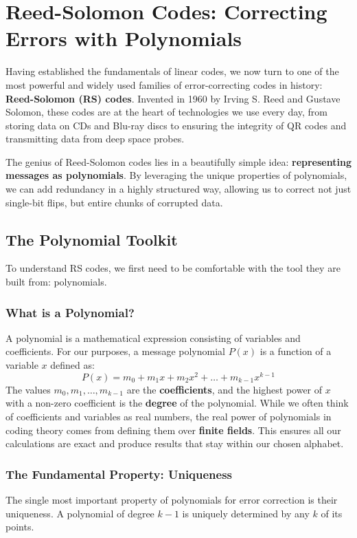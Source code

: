 \documentclass{article}
\begin{document}
\section{Reed-Solomon Codes: Correcting Errors with Polynomials}

Having established the fundamentals of linear codes, we now turn to one of the most powerful and widely used families of error-correcting codes in history: \textbf{Reed-Solomon (RS) codes}. Invented in 1960 by Irving S. Reed and Gustave Solomon, these codes are at the heart of technologies we use every day, from storing data on CDs and Blu-ray discs to ensuring the integrity of QR codes and transmitting data from deep space probes.

The genius of Reed-Solomon codes lies in a beautifully simple idea: \textbf{representing messages as polynomials}. By leveraging the unique properties of polynomials, we can add redundancy in a highly structured way, allowing us to correct not just single-bit flips, but entire chunks of corrupted data.

\subsection{The Polynomial Toolkit}
To understand RS codes, we first need to be comfortable with the tool they are built from: polynomials.

\subsubsection{What is a Polynomial?}
A polynomial is a mathematical expression consisting of variables and coefficients. For our purposes, a message polynomial $P(x)$ is a function of a variable $x$ defined as:
\[
P(x) = m_0 + m_1 x + m_2 x^2 + \dots + m_{k-1} x^{k-1}
\]
The values $m_0, m_1, \dots, m_{k-1}$ are the \textbf{coefficients}, and the highest power of $x$ with a non-zero coefficient is the \textbf{degree} of the polynomial. While we often think of coefficients and variables as real numbers, the real power of polynomials in coding theory comes from defining them over \textbf{finite fields}. This ensures all our calculations are exact and produce results that stay within our chosen alphabet.

\subsubsection{The Fundamental Property: Uniqueness}
The single most important property of polynomials for error correction is their uniqueness. A polynomial of degree $k-1$ is uniquely determined by any $k$ of its points.
\end{document}
